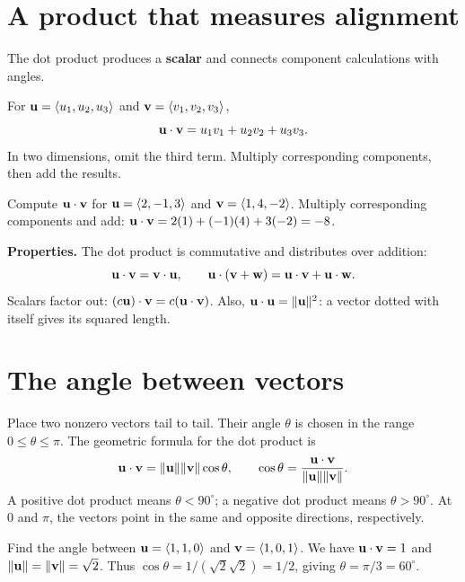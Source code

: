 \documentclass[11pt]{article}
\begin{document}

\section{A product that measures alignment}
The dot product produces a \textbf{scalar} and connects component calculations with angles.

\begin{definition}
For $\mathbf{u}=\left\langle u_1,u_2,u_3\right\rangle$ and $\mathbf{v}=\left\langle v_1,v_2,v_3\right\rangle$,
\[
  \mathbf{u}\cdot\mathbf{v}=u_1v_1+u_2v_2+u_3v_3.
\]
In two dimensions, omit the third term. Multiply corresponding components,
then add the results.
\end{definition}

\begin{example}{Compute $\mathbf{u}\cdot\mathbf{v}$ for
$\mathbf{u}=\left\langle 2,-1,3\right\rangle$ and $\mathbf{v}=\left\langle 1,4,-2\right\rangle$.}
Multiply corresponding components and add:
$\mathbf{u}\cdot\mathbf{v}=2(1)+(-1)(4)+3(-2)=-8$.
\end{example}

\textbf{Properties.} The dot product is commutative and distributes over addition:
\[
 \mathbf{u}\cdot\mathbf{v}=\mathbf{v}\cdot\mathbf{u},\qquad
 \mathbf{u}\cdot(\mathbf{v}+\mathbf{w})=\mathbf{u}\cdot\mathbf{v}+\mathbf{u}\cdot\mathbf{w}.
\]
Scalars factor out: $(c\mathbf{u})\cdot\mathbf{v}=c(\mathbf{u}\cdot\mathbf{v})$.
Also, $\mathbf{u}\cdot\mathbf{u}=\lVert\mathbf{u}\rVert^2$: a vector dotted with itself
gives its squared length.

\section{The angle between vectors}
Place two nonzero vectors tail to tail. Their angle $\theta$ is chosen in
the range $0\leq\theta\leq\pi$. The geometric formula for the dot product is
\[
 \mathbf{u}\cdot\mathbf{v}=\lVert\mathbf{u}\rVert\lVert\mathbf{v}\rVert\cos\theta,
 \qquad
 \cos\theta=\frac{\mathbf{u}\cdot\mathbf{v}}
 {\lVert\mathbf{u}\rVert\lVert\mathbf{v}\rVert}.
\]
A positive dot product means $\theta<90^\circ$; a negative dot product means
$\theta>90^\circ$. At $0$ and $\pi$, the vectors point in the same and opposite
directions, respectively.

\begin{example}{Find the angle between
$\mathbf{u}=\left\langle 1,1,0\right\rangle$ and $\mathbf{v}=\left\langle 1,0,1\right\rangle$.}
We have $\mathbf{u}\cdot\mathbf{v}=1$ and
$\lVert\mathbf{u}\rVert=\lVert\mathbf{v}\rVert=\sqrt{2}$. Thus
$\cos\theta=1/(\sqrt{2}\sqrt{2})=1/2$, giving $\theta=\pi/3=60^\circ$.
\end{example}
\end{document}
